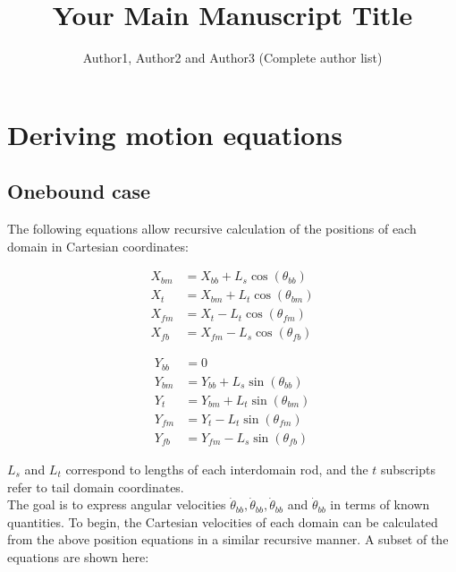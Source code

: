 \documentclass[9pt,twoside,lineno]{pnas-new}
\title{Your Main Manuscript Title}
\author{Author1, Author2 and Author3 (Complete author list)}
\begin{document}
\instructionspage  

\maketitle

\SItext


\section*{Deriving motion equations}
\subsection*{Onebound case}
The following equations allow recursive calculation of the positions of each domain in Cartesian coordinates:

\noindent\begin{minipage}{0.49\linewidth}
\begin{align}
  X_{bm} &= X_{bb}+L_{s}\cos(\theta_{bb}) \\
  X_{t}  &= X_{bm}+L_{t}\cos(\theta_{bm}) \\
  X_{fm} &= X_{t} - L_{t}\cos(\theta_{fm}) \\
  X_{fb} &= X_{fm} - L_{s}\cos(\theta_{fb})
\end{align}
\end{minipage}
\begin{minipage}{0.49\linewidth}
\begin{align}
  Y_{bb} &= 0 \\
  Y_{bm} &= Y_{bb}+L_{s}\sin(\theta_{bb}) \\
  Y_{t}  &= Y_{bm}+L_{t}\sin(\theta_{bm}) \\
  Y_{fm} &= Y_{t} - L_{t}\sin(\theta_{fm}) \\
  Y_{fb} &= Y_{fm} - L_{s}\sin(\theta_{fb})
\end{align}
\end{minipage}
\vspace{.5cm}

$L_s$ and $L_t$ correspond to lengths of each interdomain rod, and the $t$ subscripts refer to tail domain coordinates.\\

The goal is to express angular velocities $\dot{\theta}_{bb}, \dot{\theta}_{bb}, \dot{\theta}_{bb}$ and $\dot{\theta}_{bb}$ in terms of known quantities. To begin, the Cartesian velocities of each domain can be calculated from the above position equations in a similar recursive manner. A subset of the equations are shown here:
\end{document}
